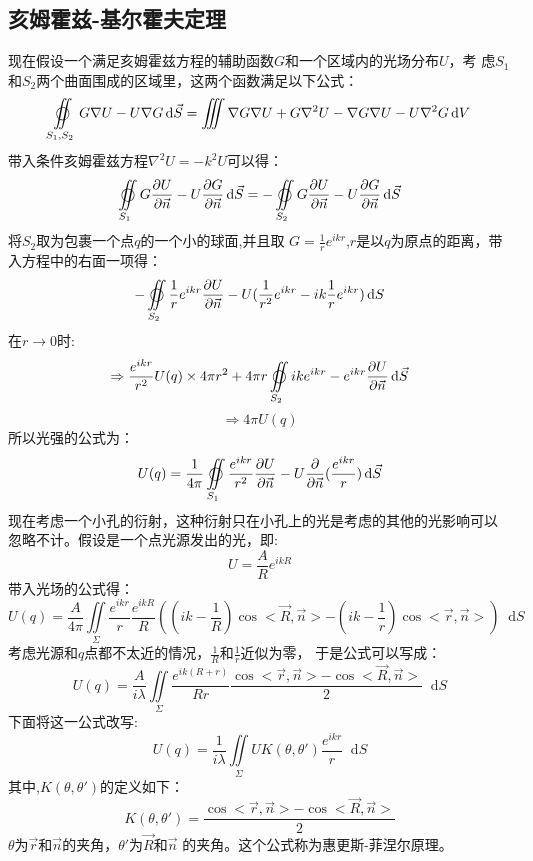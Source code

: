\documentclass{article}
\newcommand*{\dif}{\mathop{}\!\mathrm{d}}
\begin{document}
\subsection{亥姆霍兹-基尔霍夫定理}
现在假设一个满足亥姆霍兹方程的辅助函数$G$和一个区域内的光场分布$U$，考
虑$S_1$和$S_2$两个曲面围成的区域里，这两个函数满足以下公式：
\[\varoiint\limits_{S_1,S_2}G\nabla U-U\nabla G\dif \vec{S}= \iiint
  \nabla G\nabla U+G\nabla^2 U-\nabla G\nabla U-U\nabla^2G\dif V\]
带入条件亥姆霍兹方程$\nabla^2U=-k^2U$可以得：
\[\varoiint\limits_{S_1}G \frac{\partial U}{\partial \vec{n}}-U
  \frac{\partial G}{\partial \vec{n}}\dif
  \vec{S}=-\varoiint\limits_{S_2}G \frac{\partial U}{\partial\vec{n}}-U
  \frac{\partial G}{\partial\vec{n}}\dif \vec{S}\]
将$S_2$取为包裹一个点$q$的一个小的球面,并且取
$G=\frac{1}{r}e^{ikr}$,$r$是以$q$为原点的距离，带
入方程中的右面一项得：
\[-\varoiint\limits_{S_2}\frac{1}{r}e^{ikr}\frac{\partial U}{\partial
    \vec{n}}-U(\frac{1}{r^2}e^{ikr}-ik \frac{1}{r}e^{ikr})\dif S\]
在$r\rightarrow 0$时:
\[\Rightarrow \frac{e^{ikr}}{r^2}U(q) \times 4\pi r^2+4\pi r
  \varoiint\limits_{S_2}ike^{ikr}-e^{ikr}\frac{\partial U}{\partial
    \vec{n}}\dif \vec{S}\]
\[\Rightarrow 4\pi U(q)\]
所以光强的公式为：
\[U(q)=\frac{1}{4\pi}\varoiint\limits_{S_1}\frac{
    e^{ikr}}{r^2}\frac{\partial U}{\partial\vec{n}}-U
  \frac{\partial }{\partial \vec{n}}(\frac{e^{ikr}}{r})\dif
  \vec{S}\]
现在考虑一个小孔的衍射，这种衍射只在小孔上的光是考虑的其他的光影响可以
忽略不计。假设是一个点光源发出的光，即:
\[U=\frac{A}{R}e^{ikR}\]
带入光场的公式得：
\[U(q)=\frac{A}{4\pi}\iint\limits_{\Sigma}\frac{e^{ikr}}{r}\frac{e^{ikR}}{R}((ik-\frac{1}{R})\cos<\vec{R},\vec{n}>-(ik-\frac{1}{r})\cos<\vec{r},\vec{n}>)\dif
  S\]
考虑光源和$q$点都不太近的情况，$\frac{1}{R}$和$\frac{1}{r}$近似为零，
于是公式可以写成：
\[U(q)=\frac{A}{i\lambda}\iint\limits_{\Sigma}\frac{e^{ik(R+r)}}{Rr}\frac{\cos<\vec{r},\vec{n}>-\cos<\vec{R},\vec{n}>}{2}\dif
  S\]
下面将这一公式改写:
\begin{equation}
  \label{eq:13}
U(q)=\frac{1}{i\lambda}\iint\limits_{\Sigma}UK(\theta,\theta
')\frac{e^{ikr}}{r}\dif S
\end{equation}
其中,$K(\theta,\theta')$的定义如下：
\[K(\theta,\theta')=\frac{\cos<\vec{r},\vec{n}>-\cos<\vec{R},\vec{n}>}{2}\]
$\theta$为$\vec{r}$和$\vec{n}$的夹角，$\theta'$为$\vec{R}$和$\vec{n}$
的夹角。这个公式称为惠更斯-菲涅尔原理。
\end{document}
